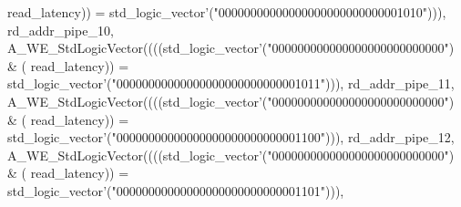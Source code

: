 \begin{DoxyCode}
{      read_latency}\textcolor{vhdlchar}{)}\textcolor{vhdlchar}{)} \textcolor{vhdlchar}{=} \textcolor{comment}{std\_logic\_vector}\textcolor{vhdlchar}{'}\textcolor{vhdlchar}{(}\textcolor{vhdllogic}{"00000000000000000000000000001010"}\textcolor{vhdlchar}{)}\textcolor{vhdlchar}{)}\textcolor{vhdlchar}{)}\textcolor{vhdlchar}{,} \textcolor{vhdlchar}{
      rd_addr_pipe_10}\textcolor{vhdlchar}{,} \textcolor{vhdlchar}{A\_WE\_StdLogicVector}\textcolor{vhdlchar}{(}\textcolor{vhdlchar}{(}\textcolor{vhdlchar}{(}\textcolor{vhdlchar}{(}\textcolor{comment}{std\_logic\_vector}\textcolor{vhdlchar}{'}\textcolor{vhdlchar}{(}\textcolor{vhdllogic}{"000000000000000000000000000"}\textcolor{vhdlchar}{)} \textcolor{vhdlchar}{&} \textcolor{vhdlchar}{(}\textcolor{vhdlchar}{
      read_latency}\textcolor{vhdlchar}{)}\textcolor{vhdlchar}{)} \textcolor{vhdlchar}{=} \textcolor{comment}{std\_logic\_vector}\textcolor{vhdlchar}{'}\textcolor{vhdlchar}{(}\textcolor{vhdllogic}{"00000000000000000000000000001011"}\textcolor{vhdlchar}{)}\textcolor{vhdlchar}{)}\textcolor{vhdlchar}{)}\textcolor{vhdlchar}{,} \textcolor{vhdlchar}{
      rd_addr_pipe_11}\textcolor{vhdlchar}{,} \textcolor{vhdlchar}{A\_WE\_StdLogicVector}\textcolor{vhdlchar}{(}\textcolor{vhdlchar}{(}\textcolor{vhdlchar}{(}\textcolor{vhdlchar}{(}\textcolor{comment}{std\_logic\_vector}\textcolor{vhdlchar}{'}\textcolor{vhdlchar}{(}\textcolor{vhdllogic}{"000000000000000000000000000"}\textcolor{vhdlchar}{)} \textcolor{vhdlchar}{&} \textcolor{vhdlchar}{(}\textcolor{vhdlchar}{
      read_latency}\textcolor{vhdlchar}{)}\textcolor{vhdlchar}{)} \textcolor{vhdlchar}{=} \textcolor{comment}{std\_logic\_vector}\textcolor{vhdlchar}{'}\textcolor{vhdlchar}{(}\textcolor{vhdllogic}{"00000000000000000000000000001100"}\textcolor{vhdlchar}{)}\textcolor{vhdlchar}{)}\textcolor{vhdlchar}{)}\textcolor{vhdlchar}{,} \textcolor{vhdlchar}{
      rd_addr_pipe_12}\textcolor{vhdlchar}{,} \textcolor{vhdlchar}{A\_WE\_StdLogicVector}\textcolor{vhdlchar}{(}\textcolor{vhdlchar}{(}\textcolor{vhdlchar}{(}\textcolor{vhdlchar}{(}\textcolor{comment}{std\_logic\_vector}\textcolor{vhdlchar}{'}\textcolor{vhdlchar}{(}\textcolor{vhdllogic}{"000000000000000000000000000"}\textcolor{vhdlchar}{)} \textcolor{vhdlchar}{&} \textcolor{vhdlchar}{(}\textcolor{vhdlchar}{
      read_latency}\textcolor{vhdlchar}{)}\textcolor{vhdlchar}{)} \textcolor{vhdlchar}{=} \textcolor{comment}{std\_logic\_vector}\textcolor{vhdlchar}{'}\textcolor{vhdlchar}{(}\textcolor{vhdllogic}{"00000000000000000000000000001101"}\textcolor{vhdlchar}{)}\textcolor{vhdlchar}{)}\textcolor{vhdlchar}{)}\textcolor{vhdlchar}{,} \textcolor{vhdlchar}{
}
\end{DoxyCode}
